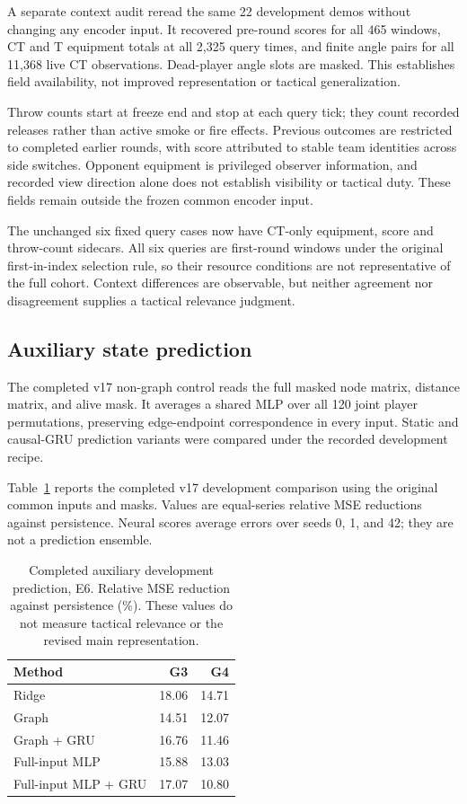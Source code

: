 A separate context audit reread the same 22 development demos without changing any encoder input. It recovered pre-round scores for all 465 windows, CT and T equipment totals at all 2,325 query times, and finite angle pairs for all 11,368 live CT observations. Dead-player angle slots are masked. This establishes field availability, not improved representation or tactical generalization. %

Throw counts start at freeze end and stop at each query tick; they count recorded releases rather than active smoke or fire effects. Previous outcomes are restricted to completed earlier rounds, with score attributed to stable team identities across side switches. Opponent equipment is privileged observer information, and recorded view direction alone does not establish visibility or tactical duty. These fields remain outside the frozen common encoder input. %

The unchanged six fixed query cases now have CT-only equipment, score and throw-count sidecars. All six queries are first-round windows under the original first-in-index selection rule, so their resource conditions are not representative of the full cohort. Context differences are observable, but neither agreement nor disagreement supplies a tactical relevance judgment. %

\subsection{Auxiliary state prediction}
\label{app:auxprediction}
The completed v17 non-graph control reads the full masked node matrix, distance matrix, and alive mask. It averages a shared MLP over all 120 joint player permutations, preserving edge-endpoint correspondence in every input. Static and causal-GRU prediction variants were compared under the recorded development recipe.

Table~\ref{tab:aux} reports the completed v17 development comparison using the original common inputs and masks. Values are equal-series relative MSE reductions against persistence. Neural scores average errors over seeds 0, 1, and 42; they are not a prediction ensemble.

\begin{table}[t]
\caption{Completed auxiliary development prediction, E6. Relative MSE reduction against persistence (\%). These values do not measure tactical relevance or the revised main representation.}
\label{tab:aux}
\centering
\begin{tabular}{lrr}
\toprule
Method & G3 & G4\\
\midrule
Ridge & 18.06 & 14.71 \\
Graph & 14.51 & 12.07 \\
Graph + GRU & 16.76 & 11.46 \\
Full-input MLP & 15.88 & 13.03 \\
Full-input MLP + GRU & 17.07 & 10.80 \\
\bottomrule
\end{tabular}
\end{table}

